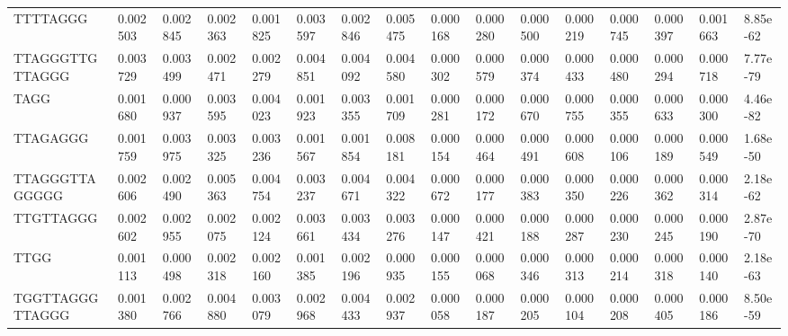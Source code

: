 \begin{samepage}
\begin{table}[h!]
\begin{tabular}{llllllllllllllll}
TTTTAGGG        & 0.002503       & 0.002845       & 0.002363       & 0.001825       & 0.003597       & 0.002846       & 0.005475       & 0.000168       & 0.000280       & 0.000500       & 0.000219       & 0.000745       & 0.000397       & 0.001663       & 8.85e-62                           \\
TTAGGGTTGTTAGGG & 0.003729       & 0.003499       & 0.002471       & 0.002279       & 0.004851       & 0.004092       & 0.004580       & 0.000302       & 0.000579       & 0.000374       & 0.000433       & 0.000480       & 0.000294       & 0.000718       & 7.77e-79                           \\
TAGG            & 0.001680       & 0.000937       & 0.003595       & 0.004023       & 0.001923       & 0.003355       & 0.001709       & 0.000281       & 0.000172       & 0.000670       & 0.000755       & 0.000355       & 0.000633       & 0.000300       & 4.46e-82                           \\
TTAGAGGG        & 0.001759       & 0.003975       & 0.003325       & 0.003236       & 0.001567       & 0.001854       & 0.008181       & 0.000154       & 0.000464       & 0.000491       & 0.000608       & 0.000106       & 0.000189       & 0.000549       & 1.68e-50                           \\
TTAGGGTTAGGGGG  & 0.002606       & 0.002490       & 0.005363       & 0.004754       & 0.003237       & 0.004671       & 0.004322       & 0.000672       & 0.000177       & 0.000383       & 0.000350       & 0.000226       & 0.000362       & 0.000314       & 2.18e-62                           \\
TTGTTAGGG       & 0.002602       & 0.002955       & 0.002075       & 0.002124       & 0.003661       & 0.003434       & 0.003276       & 0.000147       & 0.000421       & 0.000188       & 0.000287       & 0.000230       & 0.000245       & 0.000190       & 2.87e-70                           \\
TTGG            & 0.001113       & 0.000498       & 0.002318       & 0.002160       & 0.001385       & 0.002196       & 0.000935       & 0.000155       & 0.000068       & 0.000346       & 0.000313       & 0.000214       & 0.000318       & 0.000140       & 2.18e-63                           \\
TGGTTAGGGTTAGGG & 0.001380       & 0.002766       & 0.004880       & 0.003079       & 0.002968       & 0.004433       & 0.002937       & 0.000058       & 0.000187       & 0.000205       & 0.000104       & 0.000208       & 0.000405       & 0.000186       & 8.50e-59                           \\

\end{tabular}
\end{table}
\end{samepage}
